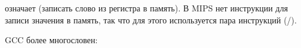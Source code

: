  означает  (записать слово из регистра в память).
В MIPS нет инструкции для записи значения в память, так что для этого используется пара инструкций (/).






\NonOptimizing GCC более многословен:





